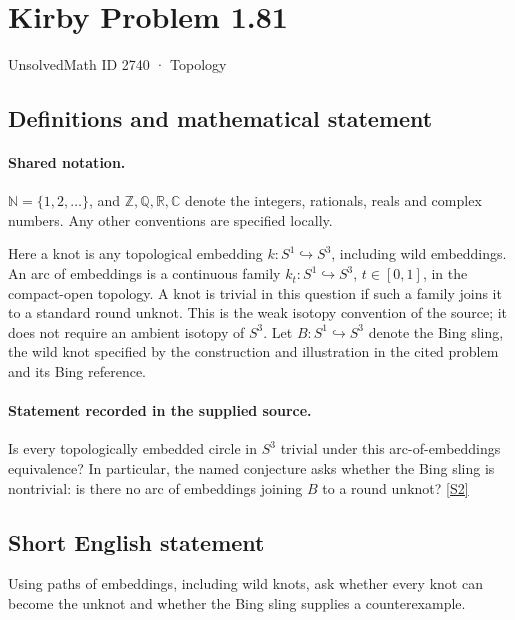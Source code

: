 \documentclass[11pt]{article}
\newcommand{\sref}[2]{\hyperlink{source:#1:#2}{[S#2]}}
\begin{document}
\setcounter{section}{2739}
\section{Kirby Problem 1.81}\label{2740}
{\small\sffamily UnsolvedMath ID 2740 · Topology}
\subsection{Definitions and mathematical statement}

\paragraph{Shared notation.}$\mathbb N=\{1,2,\ldots\}$, and $\mathbb Z,\mathbb Q,\mathbb R,\mathbb C$ denote the integers, rationals, reals and complex numbers. Any other conventions are specified locally.


Here a knot is any topological embedding $k:S^1\hookrightarrow S^3$, including wild embeddings. An arc of embeddings is a continuous family $k_t:S^1\hookrightarrow S^3$, $t\in[0,1]$, in the compact-open topology. A knot is trivial in this question if such a family joins it to a standard round unknot. This is the weak isotopy convention of the source; it does not require an ambient isotopy of $S^3$. Let $B:S^1\hookrightarrow S^3$ denote the Bing sling, the wild knot specified by the construction and illustration in the cited problem and its Bing reference.
\paragraph{Statement recorded in the supplied source.}
Is every topologically embedded circle in $S^3$ trivial under this arc-of-embeddings equivalence? In particular, the named conjecture asks whether the Bing sling is nontrivial: is there no arc of embeddings joining $B$ to a round unknot? \sref{2740}{2}

\subsection{Short English statement}
Using paths of embeddings, including wild knots, ask whether every knot can become the unknot and whether the Bing sling supplies a counterexample.
\end{document}
